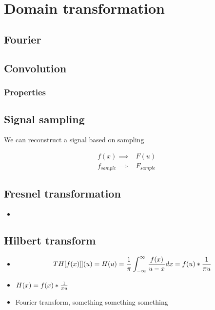 \documentclass[../main/main.tex]{subfiles}
\begin{document}
\section{Domain transformation}

\subsection{Fourier}

\subsection{Convolution}

\subsubsection{Properties}

\subsection{Signal sampling}

We can reconstruct a  signal based on sampling

\begin{align}
f(x) \implies& F(u)\\
f_{sample} \implies& F_{sample}
\end{align}

\subsection{Fresnel transformation}

\begin{itemize}
	\item 
	
\end{itemize}

\subsection{Hilbert transform}

\begin{itemize}
	\item \begin{equation}
	TH[f(x)]](u) = H(u) = \frac{1}{\pi}\int_{-\infty}^{\infty}\frac{f(x)}{u-x} dx = f(u)* \frac{1}{\pi u}
	\end{equation}
	\item $H(x) = f(x) * \frac{1}{\pi u}$
	\item Fourier transform, something something something
	
		
\end{itemize}
\end{document}

